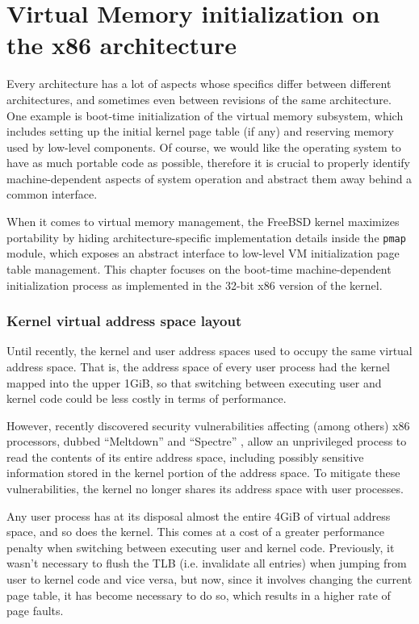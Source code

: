 \documentclass[shortabstract, english]{iithesis}
\begin{document}
\chapter{Virtual Memory initialization on the x86 architecture}

Every architecture has a lot of aspects whose specifics differ between different
architectures, and sometimes even between revisions of the same architecture.
One example is boot-time initialization of the virtual memory subsystem, which
includes setting up the initial kernel page table (if any) and reserving memory
used by low-level components. Of course, we would like the operating system to
have as much portable code as possible, therefore it is crucial to properly
identify machine-dependent aspects of system operation and abstract them away
behind a common interface.

When it comes to virtual memory management, the FreeBSD kernel maximizes
portability by hiding architecture-specific implementation details inside the
\texttt{pmap} \cite{freebsd:pmap} module, which exposes an abstract interface to
low-level VM initialization page table management. This chapter focuses on the
boot-time machine-dependent initialization process as implemented in the 32-bit
x86 version of the kernel.

\subsection{Kernel virtual address space layout}

Until recently, the kernel and user address spaces used to occupy the same
virtual address space. That is, the address space of every user process had the
kernel mapped into the upper 1GiB, so that switching between executing user and
kernel code could be less costly in terms of performance.

However, recently discovered security vulnerabilities affecting (among others)
x86 processors, dubbed ``Meltdown'' \cite{bib:meltdown} and ``Spectre''
\cite{bib:spectre}, allow an unprivileged process to read the contents of its
entire address space, including possibly sensitive information stored in the
kernel portion of the address space. To mitigate these vulnerabilities, the
kernel no longer shares its address space with user processes.

Any user process has at its disposal almost the entire 4GiB of virtual address
space, and so does the kernel. This comes at a cost of a greater performance
penalty when switching between executing user and kernel code. Previously, it
wasn't necessary to flush the TLB (i.e. invalidate all entries) when jumping
from user to kernel code and vice versa, but now, since it involves changing the
current page table, it has become necessary to do so, which results in a
higher rate of page faults.
\end{document}
